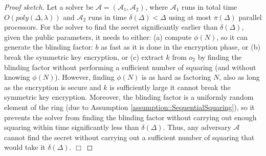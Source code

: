 \begin{proof}[Proof sketch] 
Let  a solver be $\mathcal{A}=(\mathcal{A}_{\scriptscriptstyle 1},\mathcal{A}_{\scriptscriptstyle 2})$, where $\mathcal{A}_{\scriptscriptstyle 1}$ runs in total time $O(poly(\Delta,\lambda))$ and $\mathcal{A}_{\scriptscriptstyle 2}$ runs in  time $\delta(\Delta)<\Delta$ using at most $\pi(\Delta)$ parallel processors. For  the solver to find  the secret significantly earlier than $\delta(\Delta)$, given the public parameters, it needs to either: (a) compute $\phi(N)$, so it can generate the blinding factor: $b$ as fast as it is done in the encryption phase, or (b) break the symmetric key encryption, or (c) extract $k$ from $o_{\scriptscriptstyle 2}$ by finding the blinding factor without performing a sufficient number of  squaring (and without knowing $\phi(N)$). However,  finding  $\phi(N)$ is as hard as factoring $N$, also as long as the encryption is secure and $k$ is sufficiently large  it cannot break the symmetric key encryption. Moreover,  the blinding factor is a uniformly random element of the ring (due to Assumption \ref{assumption::SequentialSquaring}), so it prevents the solver from finding the blinding factor without carrying out enough squaring within time significantly less than $\delta(\Delta)$. Thus, any  adversary $\mathcal{A}$ cannot find the secret without carrying out a sufficient number of squaring that would take it $\delta(\Delta)$. \hfill\(\Box\)
\end{proof}